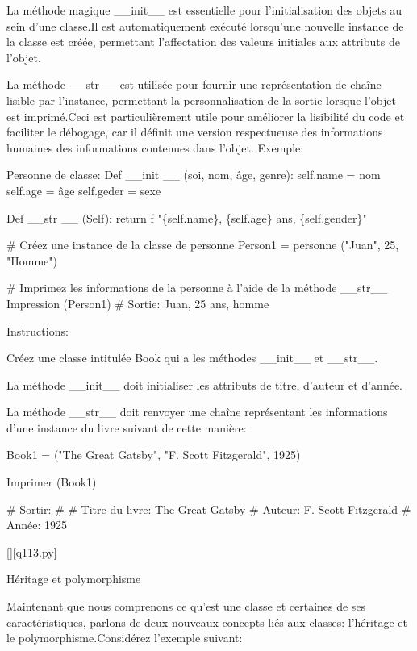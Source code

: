La méthode magique \_\_init\_\_ est essentielle pour l'initialisation des objets au sein d'une classe.Il est automatiquement exécuté lorsqu'une nouvelle instance de la classe est créée, permettant l'affectation des valeurs initiales aux attributs de l'objet.

La méthode \_\_str\_\_ est utilisée pour fournir une représentation de chaîne lisible par l'instance, permettant la personnalisation de la sortie lorsque l'objet est imprimé.Ceci est particulièrement utile pour améliorer la lisibilité du code et faciliter le débogage, car il définit une version respectueuse des informations humaines des informations contenues dans l'objet.
Exemple:

Personne de classe:
Def \_\_init \_\_ (soi, nom, âge, genre):
self.name = nom
self.age = âge
self.geder = sexe

Def \_\_str \_\_ (Self):
return f "\{self.name\}, \{self.age\} ans, \{self.gender\}"

\# Créez une instance de la classe de personne
Person1 = personne ("Juan", 25, "Homme")

\# Imprimez les informations de la personne à l'aide de la méthode \_\_str\_\_
Impression (Person1) \# Sortie: Juan, 25 ans, homme

Instructions:

Créez une classe intitulée Book qui a les méthodes \_\_init\_\_ et \_\_str\_\_.

La méthode \_\_init\_\_ doit initialiser les attributs de titre, d'auteur et d'année.

La méthode \_\_str\_\_ doit renvoyer une chaîne représentant les informations d'une instance du livre suivant de cette manière:

Book1 = ("The Great Gatsby", "F. Scott Fitzgerald", 1925)

Imprimer (Book1)

\# Sortir:
\#
\# Titre du livre: The Great Gatsby
\# Auteur: F. Scott Fitzgerald
\# Année: 1925
        \par
        \renewcommand{\nomfichier}{q113.py}
        \begin{solution}
            \pythonfile{\chemincode \nomfichier}[][\nomfichier]
        \end{solution}
        

        \question
        Héritage et polymorphisme

Maintenant que nous comprenons ce qu'est une classe et certaines de ses caractéristiques, parlons de deux nouveaux concepts liés aux classes: l'héritage et le polymorphisme.Considérez l'exemple suivant:

